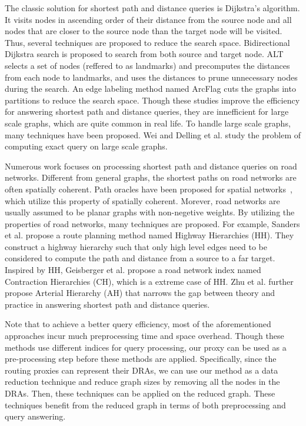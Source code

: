 The classic solution for shortest path and distance queries is Dijkstra's algorithm\cite{Dijkstra59}. It visits nodes in ascending order of their distance from the source node and all nodes that are closer to the source node than the target node will be visited. Thus, several techniques are proposed to reduce the search space\cite{LubyR89, GoldbergH05}. Bidirectional Dijkstra search\cite{LubyR89} is proposed to search from both source and target node. ALT\cite{GoldbergH05} selects a set of nodes (reffered to as landmarks) and precomputes the distances from each node to landmarks, and uses the distances to prune unnecessary nodes during the search. An edge labeling method named ArcFlag \cite{MohringSSWW05} cuts the graphs into partitions to reduce the search space. Though these studies improve the efficiency for answering shortest path and distance queries, they are innefficient for large scale graphs, which are quite common in real life. To handle large scale graphs, many techniques have been proposed\cite{delling2014robust, Wei10}. Wei \cite{Wei10} and Delling et al.\cite{delling2014robust} study the problem of computing exact query on large scale graphs.

Numerous work focuses on processing shortest path and distance queries on road networks. Different from general graphs, the shortest paths on road networks are often spatially coherent. Path oracles have been proposed for spatial networks~\cite{SankaranarayananSA09}, which utilize this property of spatially coherent. Morever, road networks are usually assumed to be planar graphs with non-negetive weights\cite{fakcharoenphol2006planar,gupta2004roads,MozesS12}. By utilizing the properties of road networks, many techniques\cite{SandersS05, GeisbergerSSD08, zhu2013shortest} are proposed. For example, Sanders et al. propose a route planning method named Highway Hierarchies (HH)\cite{SandersS05}. They construct a highway hierarchy such that only high level edges need to be considered to compute the path and distance from a source to a far target. Inspired by HH, Geisberger et al.\cite{GeisbergerSSD08} propose a road network index named Contraction Hierarchies (CH), which is a extreme case of HH. Zhu et al. further propose Arterial Hierarchy (AH)\cite{zhu2013shortest} that narrows the gap between theory and practice in answering shortest path and distance queries.

Note that to achieve a better query efficiency, most of the aforementioned approaches incur much preprocessing time and space overhead. Though these methods use different indices for query processing, our proxy can be used as a pre-processing step before these methods are applied. Specifically, since the routing proxies can represent their DRAs, we can use our method as a data reduction technique and reduce graph sizes by removing all the nodes in the DRAs. Then, these techniques can be applied on the reduced graph. These techniques benefit from the reduced graph in terms of both preprocessing and query answering.


